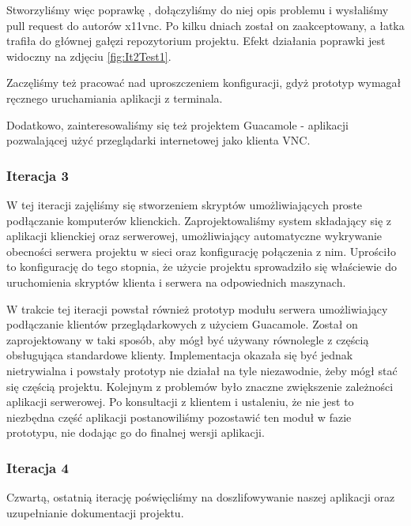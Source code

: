       Stworzyliśmy więc poprawkę \cite{x11vncPatch}, dołączyliśmy do niej opis problemu i wysłaliśmy pull request \cite{x11vncPullRequest} do autorów x11vnc. Po kilku dniach został on zaakceptowany, a łatka trafiła do głównej gałęzi repozytorium projektu. Efekt działania poprawki jest widoczny na zdjęciu \ref{fig:It2Test1}.


      Zaczęliśmy też pracować nad uproszczeniem konfiguracji, gdyż prototyp wymagał ręcznego uruchamiania aplikacji z terminala.

      Dodatkowo, zainteresowaliśmy się też projektem Guacamole \cite{Guacamole} - aplikacji pozwalającej użyć przeglądarki internetowej jako klienta VNC.

    \subsubsection{Iteracja 3}

      W tej iteracji zajęliśmy się stworzeniem skryptów umożliwiających proste podłączanie komputerów klienckich. Zaprojektowaliśmy system składający się z aplikacji klienckiej oraz serwerowej, umożliwiający automatyczne wykrywanie obecności serwera projektu w sieci oraz konfigurację połączenia z nim. Uprościło to konfigurację do tego stopnia, że użycie projektu sprowadziło się właściewie do uruchomienia skryptów klienta i serwera na odpowiednich maszynach.

    W trakcie tej iteracji powstał również prototyp modułu serwera umożliwiający podłączanie klientów przeglądarkowych z użyciem Guacamole. Został on zaprojektowany w taki sposób, aby mógł być używany równolegle z częścią obsługująca standardowe  klienty. Implementacja okazała się być jednak nietrywialna i powstały prototyp nie działał na tyle niezawodnie, żeby mógł stać się częścią projektu. Kolejnym z problemów było znaczne zwiększenie zależności aplikacji serwerowej. Po konsultacji z klientem i ustaleniu, że nie jest to niezbędna część aplikacji postanowiliśmy pozostawić ten moduł w fazie prototypu, nie dodając go do finalnej wersji aplikacji.

    \subsubsection{Iteracja 4}
      Czwartą, ostatnią iterację poświęcliśmy na doszlifowywanie naszej aplikacji oraz uzupełnianie dokumentacji projektu.

